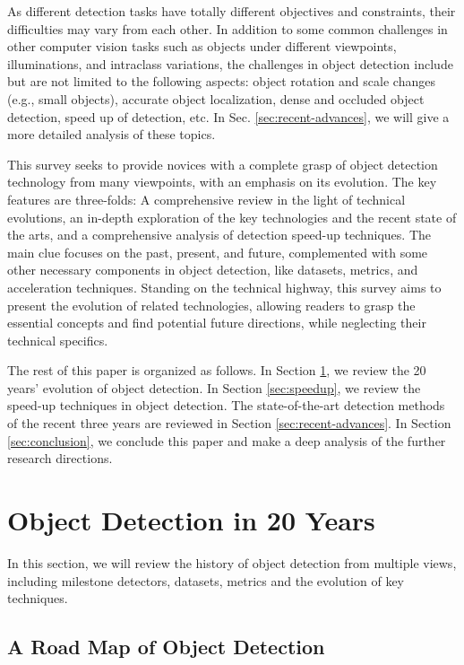 \documentclass[lettersize,journal]{IEEEtran}
\begin{document}
As different detection tasks have totally different objectives and constraints, their difficulties may vary from each other. In addition to some common challenges in other computer vision tasks such as objects under different viewpoints, illuminations, and intraclass variations, the challenges in object detection include but are not limited to the following aspects: object rotation and scale changes (e.g., small objects), accurate object localization, dense and occluded object detection, speed up of detection, etc. In Sec. \ref{sec:recent-advances}, we will give a more detailed analysis of these topics.



This survey seeks to provide novices with a complete grasp of object detection technology from many viewpoints, with an emphasis on its evolution. The key features are three-folds: A comprehensive review in the light of technical evolutions, an in-depth exploration of the key technologies and the recent state of the arts, and a comprehensive analysis of detection speed-up techniques. The main clue focuses on the past, present, and future, complemented with some other  necessary components in object detection, like datasets, metrics, and acceleration techniques. Standing on the technical highway, this survey aims to present the evolution of related technologies, allowing readers to grasp the essential concepts and find potential future directions, while neglecting their technical specifics.



The rest of this paper is organized as follows. In Section \ref{sec:20years}, we review the 20 years' evolution of object detection. In Section \ref{sec:speedup}, we review the speed-up techniques in object detection. The state-of-the-art detection methods of the recent three years are reviewed in Section \ref{sec:recent-advances}. In Section \ref{sec:conclusion}, we conclude this paper and make a deep analysis of the further research directions.


\section{Object Detection in 20 Years}\label{sec:20years}

In this section, we will review the history of object detection from multiple views, including milestone detectors, datasets, metrics and the evolution of key techniques.

\subsection{A Road Map of Object Detection}
\end{document}
